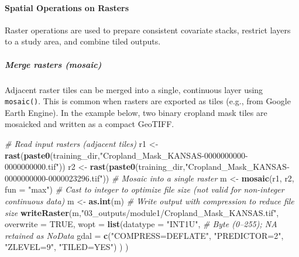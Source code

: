 \documentclass[
  10pt,
  b5paper,
  oneside]{book}
\newenvironment{Shaded}{\begin{snugshade}}{\end{snugshade}}
\newcommand{\AttributeTok}[1]{\textcolor[rgb]{0.13,0.29,0.53}{#1}}
\newcommand{\CommentTok}[1]{\textcolor[rgb]{0.56,0.35,0.01}{\textit{#1}}}
\newcommand{\ConstantTok}[1]{\textcolor[rgb]{0.56,0.35,0.01}{#1}}
\newcommand{\FunctionTok}[1]{\textcolor[rgb]{0.13,0.29,0.53}{\textbf{#1}}}
\newcommand{\NormalTok}[1]{#1}
\newcommand{\OtherTok}[1]{\textcolor[rgb]{0.56,0.35,0.01}{#1}}
\newcommand{\StringTok}[1]{\textcolor[rgb]{0.31,0.60,0.02}{#1}}
\begin{document}
\paragraph*{Spatial Operations on Rasters}\label{spatial-operations-on-rasters}

Raster operations are used to prepare consistent covariate stacks, restrict layers to a study area, and combine tiled outputs.

\subparagraph*{Merge rasters (mosaic)}\label{merge-rasters-mosaic}

Adjacent raster tiles can be merged into a single, continuous layer using \texttt{mosaic()}. This is common when rasters are exported as tiles (e.g., from Google Earth Engine). In the example below, two binary cropland mask tiles are mosaicked and written as a compact GeoTIFF.

\begin{Shaded}
\begin{Highlighting}[]
\CommentTok{\# Read input rasters (adjacent tiles)}
\NormalTok{r1 }\OtherTok{\textless{}{-}} \FunctionTok{rast}\NormalTok{(}\FunctionTok{paste0}\NormalTok{(training\_dir,}\StringTok{"Cropland\_Mask\_KANSAS{-}0000000000{-}0000000000.tif"}\NormalTok{))}
\NormalTok{r2 }\OtherTok{\textless{}{-}} \FunctionTok{rast}\NormalTok{(}\FunctionTok{paste0}\NormalTok{(training\_dir,}\StringTok{"Cropland\_Mask\_KANSAS{-}0000000000{-}0000023296.tif"}\NormalTok{))}
\CommentTok{\# Mosaic into a single raster}
\NormalTok{m }\OtherTok{\textless{}{-}} \FunctionTok{mosaic}\NormalTok{(r1, r2, }\AttributeTok{fun =} \StringTok{"max"}\NormalTok{)}
\CommentTok{\# Cast to integer to optimize file size (not valid for non{-}integer continuous data)}
\NormalTok{m }\OtherTok{\textless{}{-}} \FunctionTok{as.int}\NormalTok{(m)}
\CommentTok{\# Write output with compression to reduce file size}
\FunctionTok{writeRaster}\NormalTok{(m,}\StringTok{"03\_outputs/module1/Cropland\_Mask\_KANSAS.tif"}\NormalTok{, }\AttributeTok{overwrite =} \ConstantTok{TRUE}\NormalTok{,}
  \AttributeTok{wopt =} \FunctionTok{list}\NormalTok{(}\AttributeTok{datatype =} \StringTok{"INT1U"}\NormalTok{,  }\CommentTok{\# Byte (0–255); NA retained as NoData}
    \AttributeTok{gdal =} \FunctionTok{c}\NormalTok{(}\StringTok{"COMPRESS=DEFLATE"}\NormalTok{, }\StringTok{"PREDICTOR=2"}\NormalTok{, }\StringTok{"ZLEVEL=9"}\NormalTok{, }\StringTok{"TILED=YES"}\NormalTok{)}
\NormalTok{  )}
\NormalTok{)}
\end{Highlighting}
\end{Shaded}
\end{document}

